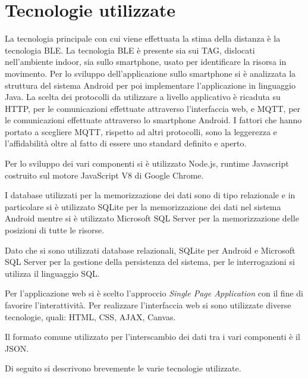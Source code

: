 
\chapter{Tecnologie utilizzate}
\label{cap:tecnologie-utilizzate}

La tecnologia principale con cui viene effettuata la stima della distanza è la tecnologia BLE. La tecnologia BLE è presente sia sui TAG, dislocati nell'ambiente indoor, sia sullo smartphone, usato per identificare la risorsa in movimento. Per lo sviluppo dell'applicazione sullo smartphone si è analizzata la struttura del sistema Android per poi implementare l'applicazione in linguaggio Java. La scelta dei protocolli da utilizzare a livello applicativo è ricaduta su HTTP, per le comunicazioni effettuate attraverso l'interfaccia web, e MQTT, per le comunicazioni effettuate attraverso lo smartphone Android. I fattori che hanno portato a scegliere MQTT, rispetto ad altri protocolli, sono la leggerezza e l'affidabilità oltre al fatto di essere uno standard definito e aperto.

Per lo sviluppo dei vari componenti si è utilizzato Node.js, runtime Javascript costruito sul motore JavaScript V8 di Google Chrome.

I database utilizzati per la memorizzazione dei dati sono di tipo relazionale e in particolare si è utilizzato SQLite per la memorizzazione dei dati nel sistema Android mentre si è utilizzato Microsoft SQL Server per la memorizzazione delle posizioni di tutte le risorse.

Dato che si sono utilizzati database relazionali, SQLite per Android e Microsoft SQL Server per la gestione della persistenza del sistema, per le interrogazioni si utilizza il linguaggio SQL.

Per l'applicazione web si è scelto l'approccio \emph{Single Page Application} con il fine di favorire l'interattività. Per realizzare l'interfaccia web si sono utilizzate diverse tecnologie, quali: HTML, CSS, AJAX, Canvas.

Il formato comune utilizzato per l'interscambio dei dati tra i vari componenti è il JSON.

Di seguito si descrivono brevemente le varie tecnologie utilizzate.

